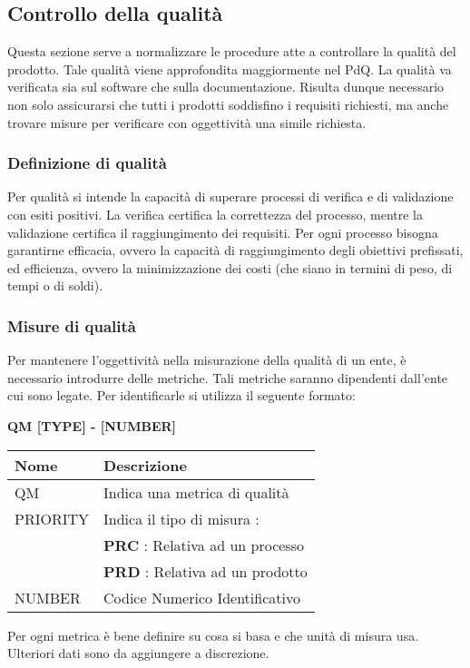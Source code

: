 \subsection{Controllo della qualità}
Questa sezione serve a normalizzare le procedure atte a controllare la qualità del prodotto.
Tale qualità viene approfondita maggiormente nel PdQ. \newline
La qualità va verificata sia sul software che sulla documentazione. \newline
Risulta dunque necessario non solo assicurarsi che tutti i prodotti soddisfino i requisiti richiesti, 
ma anche trovare misure per verificare con oggettività una simile richiesta.
\subsubsection{Definizione di qualità}
Per qualità si intende la capacità di superare processi di verifica e di validazione con esiti positivi. \newline 
La verifica certifica la correttezza del processo, mentre la validazione certifica il raggiungimento dei requisiti. \newline
Per ogni processo bisogna garantirne efficacia, ovvero la capacità di raggiungimento degli obiettivi 
prefissati, ed efficienza, ovvero la minimizzazione dei costi (che siano in termini di peso, di tempi o di soldi).
\subsubsection{Misure di qualità}
Per mantenere l'oggettività nella misurazione della qualità di un ente, è necessario introdurre delle metriche.
Tali metriche saranno dipendenti dall'ente cui sono legate. \newline
Per identificarle si utilizza il seguente formato:
\begin{center}
	\textbf{QM [TYPE] - [NUMBER]}
\end{center}
\renewcommand{\arraystretch}{1.8} %
    \begin{tabular}{ |m{7em}|m{30em}| }
        \hline
        \textbf{Nome} & \textbf{Descrizione} \\
        \hline
            QM & Indica una metrica di qualità \\
        \hline
            PRIORITY 	& 	Indica il tipo di misura : \\
                        &	\textbf{PRC} : Relativa ad un processo \\
                        &	\textbf{PRD} : Relativa ad un prodotto \\
        \hline
            NUMBER & Codice Numerico Identificativo \\
        \hline
    \end{tabular} \newline \newline
Per ogni metrica è bene definire su cosa si basa e che unità di misura usa. Ulteriori dati sono da aggiungere
a discrezione.
